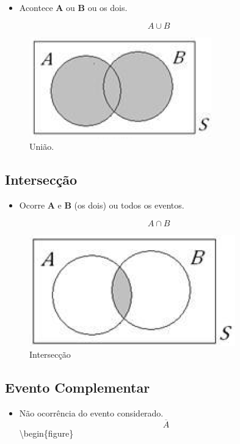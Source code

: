 \documentclass[
]{book}
\providecommand{\tightlist}{%
  \setlength{\itemsep}{0pt}\setlength{\parskip}{0pt}}
\begin{document}
\begin{itemize}
\tightlist
\item
  Acontece \textbf{A} ou \textbf{B} ou os dois.
\end{itemize}

\[A \cup B\]

\begin{figure}

{\centering \includegraphics[width=0.25\linewidth]{figuras/uniao} 

}

\caption{União.}\label{fig:unnamed-chunk-1}
\end{figure}

\hypertarget{intersecuxe7uxe3o}{%
\subsection{Intersecção}\label{intersecuxe7uxe3o}}

\begin{itemize}
\tightlist
\item
  Ocorre \textbf{A} e \textbf{B} (os dois) ou todos os eventos.
\end{itemize}

\[A\cap B\]

\begin{figure}

{\centering \includegraphics[width=0.25\linewidth]{figuras/interseccao} 

}

\caption{Intersecção}\label{fig:unnamed-chunk-2}
\end{figure}

\hypertarget{evento-complementar}{%
\subsection{Evento Complementar}\label{evento-complementar}}

\begin{itemize}
\tightlist
\item
  Não ocorrência do evento considerado.
  \[\overline{A}\]
  \textbackslash begin\{figure\}
\end{itemize}
\end{document}

